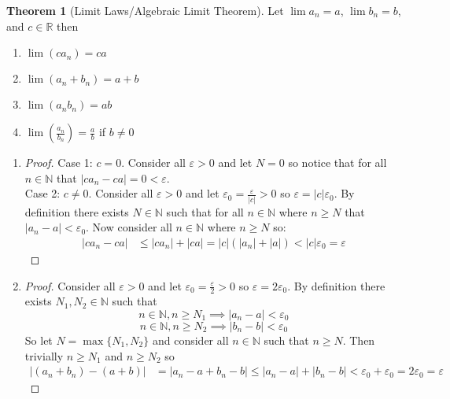 \documentclass[12pt]{article}
\theoremstyle{definition}
\theoremstyle{definition}
\newtheorem{theorem}{Theorem}
\theoremstyle{definition}
\theoremstyle{definition}
\begin{document}
\begin{flushleft}
\begin{theorem}[Limit Laws/Algebraic Limit Theorem]
    Let $\lim a_n = a$, $\lim b_n = b$, and $c \in \mathbb{R}$ then
    \begin{enumerate}
        \item $\lim(ca_n) = ca$
        \item $\lim(a_n + b_n) = a + b$
        \item $\lim(a_nb_n) = ab$
        \item $\lim\left(\frac{a_n}{b_n}\right) = \frac{a}{b}$ if $b \neq 0$
    \end{enumerate}
\end{theorem}
\begin{enumerate}
    \item
    \begin{proof}
        Case 1: $c = 0$. Consider all $\varepsilon > 0$ and let $N = 0$ so notice that for all $n \in \mathbb{N}$ that $|ca_n - ca| = 0 < \varepsilon$. \\
        Case 2: $c \neq 0$. Consider all $\varepsilon > 0$ and let $\varepsilon_0 = \frac{\varepsilon}{|c|} > 0$ so $\varepsilon = |c|\varepsilon_0$. By definition there exists $N \in \mathbb{N}$ such that for all $n \in \mathbb{N}$ where $n \geq N$ that $|a_n - a| < \varepsilon_0$. Now consider all $n \in \mathbb{N}$ where $n \geq N$ so:
        \begin{align*}
            |ca_n - ca|
            &\leq |ca_n| + |ca|
            = |c|(|a_n| + |a|)
            < |c|\varepsilon_0
            = \varepsilon
        \end{align*}
    \end{proof}
    \item
    \begin{proof}
        Consider all $\varepsilon > 0$ and let $\varepsilon_0 = \frac{\varepsilon}{2} > 0$ so $\varepsilon = 2\varepsilon_0$. By definition there exists $N_1, N_2 \in \mathbb{N}$ such that
        \[
            n \in \mathbb{N}, n \geq N_1 \implies |a_n - a| < \varepsilon_0
        \]
        \[
            n \in \mathbb{N}, n \geq N_2 \implies |b_n - b| < \varepsilon_0
        \]
        So let $N = \max\{N_1, N_2\}$ and consider all $n \in \mathbb{N}$ such that $n \geq N$. Then trivially $n \geq N_1$ and $n \geq N_2$ so
        \begin{align*}
            |(a_n + b_n) - (a + b)|
            &= |a_n - a + b_n - b|
            \leq |a_n - a| + |b_n - b|
            < \varepsilon_0 + \varepsilon_0
            = 2\varepsilon_0
            = \varepsilon
        \end{align*}
    \end{proof}
\end{enumerate}

\end{flushleft}
\end{document}
